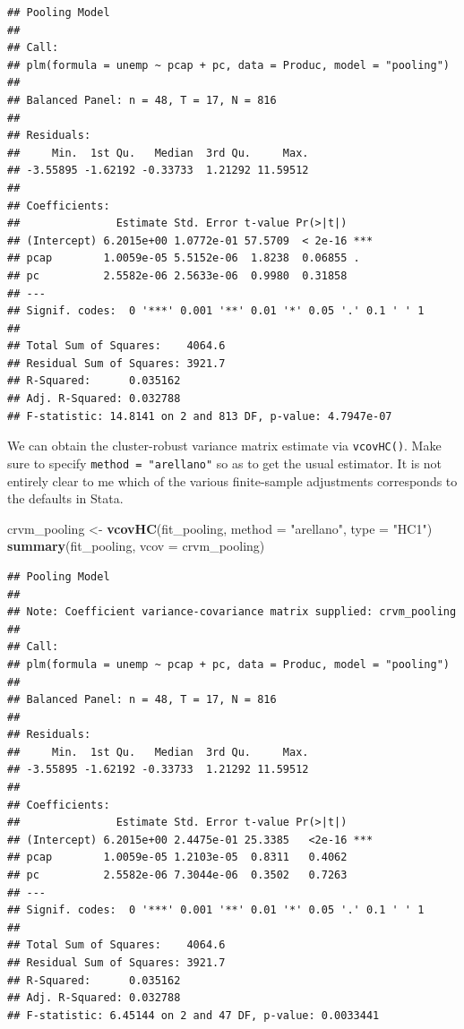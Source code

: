\documentclass[
  12pt,
  oneside,openany]{book}
\newenvironment{Shaded}{\begin{snugshade}}{\end{snugshade}}
\newcommand{\DataTypeTok}[1]{\textcolor[rgb]{0.13,0.29,0.53}{#1}}
\newcommand{\KeywordTok}[1]{\textcolor[rgb]{0.13,0.29,0.53}{\textbf{#1}}}
\newcommand{\NormalTok}[1]{#1}
\newcommand{\StringTok}[1]{\textcolor[rgb]{0.31,0.60,0.02}{#1}}
\begin{document}
\begin{verbatim}
## Pooling Model
## 
## Call:
## plm(formula = unemp ~ pcap + pc, data = Produc, model = "pooling")
## 
## Balanced Panel: n = 48, T = 17, N = 816
## 
## Residuals:
##     Min.  1st Qu.   Median  3rd Qu.     Max. 
## -3.55895 -1.62192 -0.33733  1.21292 11.59512 
## 
## Coefficients:
##               Estimate Std. Error t-value Pr(>|t|)    
## (Intercept) 6.2015e+00 1.0772e-01 57.5709  < 2e-16 ***
## pcap        1.0059e-05 5.5152e-06  1.8238  0.06855 .  
## pc          2.5582e-06 2.5633e-06  0.9980  0.31858    
## ---
## Signif. codes:  0 '***' 0.001 '**' 0.01 '*' 0.05 '.' 0.1 ' ' 1
## 
## Total Sum of Squares:    4064.6
## Residual Sum of Squares: 3921.7
## R-Squared:      0.035162
## Adj. R-Squared: 0.032788
## F-statistic: 14.8141 on 2 and 813 DF, p-value: 4.7947e-07
\end{verbatim}

We can obtain the cluster-robust variance matrix estimate via \texttt{vcovHC()}. Make sure to specify \texttt{method\ =\ "arellano"} so as to get the usual estimator. It is not entirely clear to me which of the various finite-sample adjustments corresponds to the defaults in Stata.

\begin{Shaded}
\begin{Highlighting}[]
\NormalTok{crvm\_pooling \textless{}{-}}\StringTok{ }\KeywordTok{vcovHC}\NormalTok{(fit\_pooling,}
                       \DataTypeTok{method =} \StringTok{"arellano"}\NormalTok{,}
                       \DataTypeTok{type =} \StringTok{"HC1"}\NormalTok{)}
\KeywordTok{summary}\NormalTok{(fit\_pooling, }\DataTypeTok{vcov =}\NormalTok{ crvm\_pooling)}
\end{Highlighting}
\end{Shaded}

\begin{verbatim}
## Pooling Model
## 
## Note: Coefficient variance-covariance matrix supplied: crvm_pooling
## 
## Call:
## plm(formula = unemp ~ pcap + pc, data = Produc, model = "pooling")
## 
## Balanced Panel: n = 48, T = 17, N = 816
## 
## Residuals:
##     Min.  1st Qu.   Median  3rd Qu.     Max. 
## -3.55895 -1.62192 -0.33733  1.21292 11.59512 
## 
## Coefficients:
##               Estimate Std. Error t-value Pr(>|t|)    
## (Intercept) 6.2015e+00 2.4475e-01 25.3385   <2e-16 ***
## pcap        1.0059e-05 1.2103e-05  0.8311   0.4062    
## pc          2.5582e-06 7.3044e-06  0.3502   0.7263    
## ---
## Signif. codes:  0 '***' 0.001 '**' 0.01 '*' 0.05 '.' 0.1 ' ' 1
## 
## Total Sum of Squares:    4064.6
## Residual Sum of Squares: 3921.7
## R-Squared:      0.035162
## Adj. R-Squared: 0.032788
## F-statistic: 6.45144 on 2 and 47 DF, p-value: 0.0033441
\end{verbatim}
\end{document}
